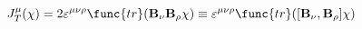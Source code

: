 \begin{equation}
J_T^{\mu }(\chi )=2\varepsilon ^{\mu \nu \rho } \func{tr}({\bf
B}_{\nu }{\bf B}_{\rho }\chi )\equiv \varepsilon ^{\mu \nu \rho
}\func{tr}([{\bf B}_{\nu },{\bf B}_{\rho }]\chi )
\end{equation}

